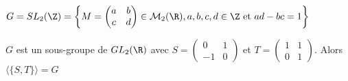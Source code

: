 \begin{exemple}

    $G = SL_2(\Z) = \left\{ M = \begin{pmatrix}
    a & b \\
    c & d
    \end{pmatrix} \in \mathcal M_2(\R), a, b, c, d \in \Z \text{ et } ad - bc = 1 \right\}$ 

    $G$ est un sous-groupe de $GL_2(\R)$ avec $S = \begin{pmatrix}
    0 & 1 \\
    -1 & 0
    \end{pmatrix}$ et $T = \begin{pmatrix}
    1 & 1 \\
    0 & 1
    \end{pmatrix}$.
    Alors $\langle \{S, T\} \rangle = G$
\end{exemple}






